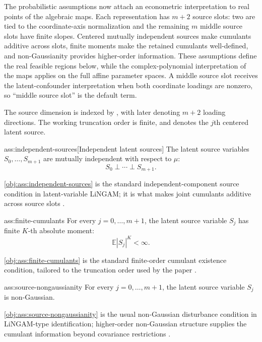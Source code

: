 \documentclass[11pt]{article}
\begin{document}
The probabilistic assumptions now attach an econometric interpretation to real points of the algebraic maps. Each representation has \(m+2\) source slots: two are tied to the coordinate-axis normalization and the remaining \(m\) middle source slots have finite slopes. Centered mutually independent sources make cumulants additive across slots, finite moments make the retained cumulants well-defined, and non-Gaussianity provides higher-order information. These assumptions define the real feasible regions below, while the complex-polynomial interpretation of the maps applies on the full affine parameter spaces. A middle source slot receives the latent-confounder interpretation when both coordinate loadings are nonzero, so ``middle source slot'' is the default term.

The source dimension is indexed by , with  later denoting \(m+2\) loading directions. The working truncation order  is finite, and  denotes the \(j\)th centered latent source.

\begin{assumptionv}{ass:independent-sources}[Independent latent sources]
The latent source variables \(S_0,\ldots,S_{m+1}\) are mutually independent with respect to \(\mu\):
\[
S_0\perp\cdots\perp S_{m+1}.
\]
\end{assumptionv}

\cref{obj:ass:independent-sources} is the standard independent-component source condition in latent-variable LiNGAM; it is what makes joint cumulants additive across source slots \citep{ChenPengHuangEtAl2025Direction}.

\begin{assumptionv}{ass:finite-cumulants}
For every \(j=0,\ldots,m+1\), the latent source variable \(S_j\) has finite \(K\)-th absolute moment:
\[
\mathbb E |S_j|^K<\infty .
\]
\end{assumptionv}

\cref{obj:ass:finite-cumulants} is the standard finite-order cumulant existence condition, tailored to the truncation order used by the paper \citep{ChenPengHuangEtAl2025Direction}.

\begin{assumptionv}{ass:source-nongaussianity}
For every \(j=0,\ldots,m+1\), the latent source variable \(S_j\) is non-Gaussian.
\end{assumptionv}

\cref{obj:ass:source-nongaussianity} is the usual non-Gaussian disturbance condition in LiNGAM-type identification; higher-order non-Gaussian structure supplies the cumulant information beyond covariance restrictions \citep{ChenPengHuangEtAl2025Direction}.
\end{document}
